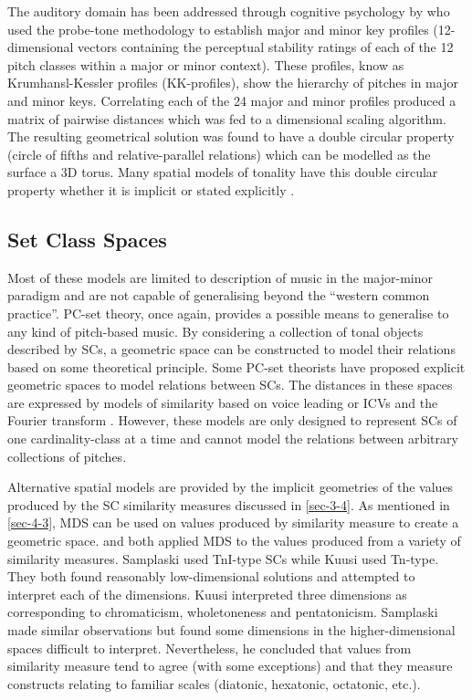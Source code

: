 \documentclass{article}
\begin{document}
The auditory domain has been addressed through cognitive psychology by
\citet{Krumhansl1990} who used the probe-tone methodology
\citep{Krumhansl1979} to establish major and minor key profiles
(12-dimensional vectors containing the perceptual stability ratings of
each of the 12 pitch classes within a major or minor context). These
profiles, know as Krumhansl-Kessler profiles (KK-profiles), show the
hierarchy of pitches in major and minor keys. Correlating each of the
24 major and minor profiles produced a matrix of pairwise distances
which was fed to a dimensional scaling algorithm. The resulting
geometrical solution was found to have a double circular property
(circle of fifths and relative-parallel relations) which can be
modelled as the surface a 3D torus. Many spatial models of tonality
have this double circular property whether it is implicit
\citep{Weber,Schoenberg} or stated explicitly \citep{Lerdahl2001a}.
\subsection{Set Class Spaces}
\label{sec-5-4}

Most of these models are limited to description of music in the
major-minor paradigm and are not capable of generalising beyond the
``western common practice''. PC-set theory, once again, provides a
possible means to generalise to any kind of pitch-based music. By
considering a collection of tonal objects described by SCs, a
geometric space can be constructed to model their relations based on
some theoretical principle. Some PC-set theorists have proposed
explicit geometric spaces to model relations between SCs. The
distances in these spaces are expressed by models of similarity based
on voice leading \citep{Cohn2003,Tymoczko2012} or ICVs and the Fourier
transform \citep{Quinn2006, Quinn2007}. However, these models are only
designed to represent SCs of one cardinality-class at a time and
cannot model the relations between arbitrary collections of pitches.

Alternative spatial models are provided by the implicit geometries of
the values produced by the SC similarity measures discussed in \ref{sec-3-4}. As mentioned in \ref{sec-4-3}, MDS
can be used on values produced by similarity measure to create a
geometric space. \citet{Kuusi2001} and \citet{Samplaski2005a} both
applied MDS to the values produced from a variety of similarity
measures. Samplaski used TnI-type SCs while Kuusi used Tn-type. They
both found reasonably low-dimensional solutions and attempted to
interpret each of the dimensions. Kuusi interpreted three dimensions
as corresponding to chromaticism, wholetoneness and
pentatonicism. Samplaski made similar observations but found some
dimensions in the higher-dimensional spaces difficult to
interpret. Nevertheless, he concluded that values from similarity
measure tend to agree (with some exceptions) and that they measure
constructs relating to familiar scales (diatonic, hexatonic,
octatonic, etc.).
\end{document}
